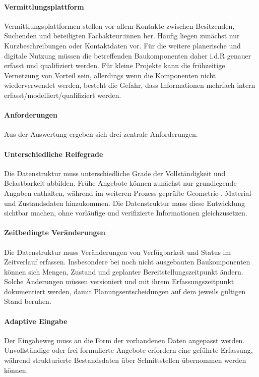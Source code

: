 \documentclass[type=zwischenbericht]{zukunftbau}
\begin{document}
\begin{SemioNest}
\begin{SemioNest}
\paragraph{Vermittlungsplattform}
Vermittlungsplattformen stellen vor allem Kontakte zwischen Besitzenden, Suchenden und beteiligten Fachakteur:innen her. Häufig liegen zunächst nur Kurzbeschreibungen oder Kontaktdaten vor. Für die weitere planerische und digitale Nutzung müssen die betreffenden Baukomponenten daher i.d.R genauer erfasst und qualifiziert werden. Für kleine Projekte kann die frühzeitige Vernetzung von Vorteil sein, allerdings wenn die Komponenten nicht wiederverwendet werden, besteht die Gefahr, dass Informationen mehrfach intern erfasst/modelliert/qualifiziert werden.
  
\paragraph{Anforderungen}
Aus der Auswertung ergeben sich drei zentrale Anforderungen.

\begin{SemioNest}
\paragraph{Unterschiedliche Reifegrade}
Die Datenstruktur muss unterschiedliche Grade der Vollständigkeit und Belastbarkeit abbilden. Frühe Angebote können zunächst nur grundlegende Angaben enthalten, während im weiteren Prozess geprüfte Geometrie-, Material- und Zustandsdaten hinzukommen. Die Datenstruktur muss diese Entwicklung sichtbar machen, ohne vorläufige und verifizierte Informationen gleichzusetzen.

\paragraph{Zeitbedingte Veränderungen}
Die Datenstruktur muss Veränderungen von Verfügbarkeit und Status im Zeitverlauf erfassen. Insbesondere bei noch nicht ausgebauten Baukomponenten können sich Mengen, Zustand und geplanter Bereitstellungszeitpunkt ändern. Solche Änderungen müssen versioniert und mit ihrem Erfassungszeitpunkt dokumentiert werden, damit Planungsentscheidungen auf dem jeweils gültigen Stand beruhen.

\paragraph{Adaptive Eingabe}
Der Eingabeweg muss an die Form der vorhandenen Daten angepasst werden. Unvollständige oder frei formulierte Angebote erfordern eine geführte Erfassung, während strukturierte Bestandsdaten über Schnittstellen übernommen werden können.
\end{SemioNest}


\end{SemioNest}
\end{SemioNest}
\end{document}
